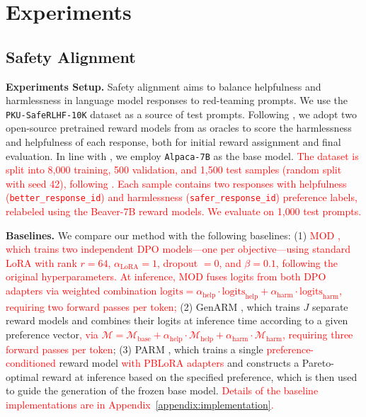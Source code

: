 \documentclass{article}
\begin{document}
\section{Experiments}
\label{sec:exp}

\subsection{Safety Alignment}
\textbf{Experiments Setup.}
Safety alignment aims to balance helpfulness and harmlessness in language model responses to red-teaming prompts. We use the \texttt{PKU-SafeRLHF-10K} dataset \citep{ji2023beavertails} as a source of test prompts. Following \cite{zhou2024beyond}, we adopt two open-source pretrained reward models from \cite{ji2023beavertails} as oracles to score the harmlessness and helpfulness of each response, both for initial reward assignment and final evaluation. In line with \cite{xu2024genarm}, we employ \texttt{Alpaca-7B} as the base model. \textcolor{red}{The dataset is split into 8{,}000 training, 500 validation, and 1{,}500 test samples (random split with seed 42), following \citet{lin2025parm}. Each sample contains two responses with helpfulness (\texttt{better\_response\_id}) and harmlessness (\texttt{safer\_response\_id}) preference labels, relabeled using the Beaver-7B reward models. We evaluate on 1{,}000 test prompts.}

\textbf{Baselines.}
We compare our method with the following baselines:
(1) \textcolor{red}{MOD \citep{shi2024decoding}, which trains two independent DPO models---one per objective---using standard LoRA with rank $r{=}64$, $\alpha_{\mathrm{LoRA}}{=}1$, dropout $= 0$, and $\beta{=}0.1$, following the original hyperparameters. At inference, MOD fuses logits from both DPO adapters via weighted combination $\mathrm{logits} = \alpha_{\mathrm{help}} \cdot \mathrm{logits}_{\mathrm{help}} + \alpha_{\mathrm{harm}} \cdot \mathrm{logits}_{\mathrm{harm}}$, requiring two forward passes per token;}
(2) GenARM \citep{xu2024genarm}, which trains \(J\) separate reward models and combines their logits at inference time according to a given preference vector\textcolor{red}{, via $\mathcal{M} = \mathcal{M}_{\mathrm{base}} + \alpha_{\mathrm{help}} \cdot \mathcal{M}_{\mathrm{help}} + \alpha_{\mathrm{harm}} \cdot \mathcal{M}_{\mathrm{harm}}$, requiring three forward passes per token};
(3) PARM \citep{lin2025parm}, which trains a single \textcolor{red}{preference-conditioned} reward model \textcolor{red}{with PBLoRA adapters} and constructs a Pareto-optimal reward at inference based on the specified preference, which is then used to guide the generation of the frozen base model. \textcolor{red}{Details of the baseline implementations are in Appendix~\ref{appendix:implementation}.}
\end{document}
